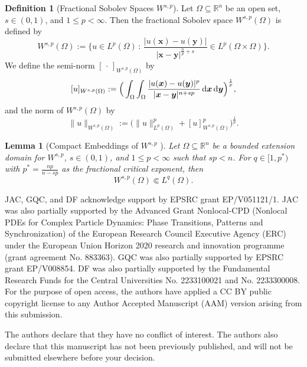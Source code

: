 \documentclass[reqno,11pt]{amsart}
\numberwithin{equation}{section}
\newtheorem{lemma}[theorem]{Lemma}
\theoremstyle{definition}
\newtheorem{definition}[theorem]{Definition}
\def\dd{{\, \rm d}}
\begin{document}
\begin{definition}[Fractional Sobolev Spaces $W^{s,p}$]\label{fraccy}
Let $\Omega \subseteq \mathbb{R}^n$ be an open set, 
$s \in (0,1)$, and $1 \leq p < \infty$.
Then the fractional Sobolev space $W^{s,p}(\Omega)$ is defined by
    \[
 W^{s,p}(\Omega) := \Big\{ u \in L^p(\Omega) \, : \, \frac{|u(\boldsymbol{x}) - u(\boldsymbol{y})|}{|\boldsymbol{x} - \boldsymbol{y}|^{\frac{n}{p}+s}} \in L^p(\Omega \times \Omega) \Big\}.
    \]
    We define the semi-norm $[\,\cdot\,]_{W^{s,p}(\Omega)}$ by
    \[
 [u]_{W^{s,p}(\Omega)} := \Big( \int_{\Omega} \int_{\Omega} \frac{|u(\boldsymbol{x}) - u(\boldsymbol{y})|^p}{|\boldsymbol{x} - \boldsymbol{y}|^{n+sp}} \dd \boldsymbol{x} \dd \boldsymbol{y} \Big)^\frac{1}{p},
    \]
    and the norm of $W^{s,p}(\Omega)$ by
    \[
 \|u\|_{W^{s,p}(\Omega)} := \Big ( \|u\|_{L^p(\Omega)}^p + [u]_{W^{s,p}(\Omega)}^p \Big )^\frac{1}{p}.
    \]
\end{definition}

\begin{lemma}[Compact Embeddings of $W^{s,p}$ ]\label{compactfraccy}
Let $\Omega \subseteq \mathbb{R}^n$ be a bounded extension domain for $W^{s,p}$, $s \in (0,1)$, 
and $1 \leq p < \infty$ such that $sp < n$. 
For $q \in [1,p^*)$ with $p^* = \frac{np}{n-sp}$ as the fractional critical exponent, then
\[
    W^{s,p}(\Omega) \Subset L^q(\Omega).
\]
\end{lemma}

\bigskip
\bigskip
{}
JAC, GQC, and DF acknowledge support by EPSRC grant EP/V051121/1. JAC was also partially supported by the Advanced Grant Nonlocal-CPD (Nonlocal PDEs for Complex Particle Dynamics: Phase Transitions, Patterns and Synchronization) of the European Research Council Executive Agency (ERC) under the European Union Horizon 2020 research and innovation programme (grant agreement No. 883363). GQC was also partially supported by EPSRC grant EP/V008854. DF was also partially supported by the Fundamental Research Funds for the Central Universities No. 2233100021 and No. 2233300008.
For the purpose of open access, the authors have applied a CC BY public copyright license to any Author Accepted Manuscript (AAM) version
arising from this submission.

\bigskip
\medskip
{} The authors declare that they have no conflict of interest.
The authors also declare that this manuscript has not been previously published,
and will not be submitted elsewhere before your decision.
\end{document}
